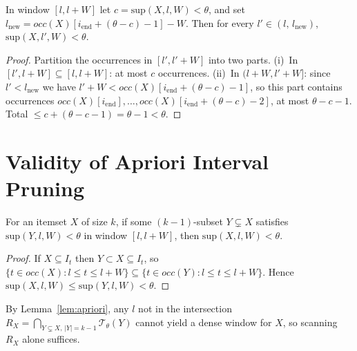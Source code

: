 \begin{lemma}\label{lem:stride_sparse}
In window $[l, l+W]$ let $c = \mathrm{sup}(X, l, W) < \theta$,
and set $l_{\mathrm{new}} = \mathit{occ}(X)[i_{\mathrm{end}} + (\theta-c) - 1] - W$.
Then for every $l' \in (l,\, l_{\mathrm{new}})$,
$\mathrm{sup}(X, l', W) < \theta$.
\end{lemma}

\begin{proof}
Partition the occurrences in $[l', l'+W]$ into two parts.
(i)~In $[l', l+W] \subseteq [l, l+W]$: at most $c$ occurrences.
(ii)~In $(l+W, l'+W]$: since $l' < l_{\mathrm{new}}$ we have
$l'+W < \mathit{occ}(X)[i_{\mathrm{end}}+(\theta-c)-1]$,
so this part contains occurrences
$\mathit{occ}(X)[i_{\mathrm{end}}], \ldots, \mathit{occ}(X)[i_{\mathrm{end}}+(\theta-c)-2]$,
at most $\theta-c-1$.
Total $\leq c + (\theta-c-1) = \theta - 1 < \theta$.
\end{proof}

\section{Validity of Apriori Interval Pruning}

\begin{lemma}\label{lem:apriori}
For an itemset $X$ of size $k$, if some $(k{-}1)$-subset $Y \subsetneq X$
satisfies $\mathrm{sup}(Y, l, W) < \theta$ in window $[l, l+W]$,
then $\mathrm{sup}(X, l, W) < \theta$.
\end{lemma}

\begin{proof}
If $X \subseteq I_t$ then $Y \subset X \subseteq I_t$, so
$\{t \in \mathit{occ}(X) : l \leq t \leq l+W\} \subseteq
 \{t \in \mathit{occ}(Y) : l \leq t \leq l+W\}$.
Hence $\mathrm{sup}(X, l, W) \leq \mathrm{sup}(Y, l, W) < \theta$.
\end{proof}

By Lemma~\ref{lem:apriori}, any $l$ not in the intersection
$R_X = \bigcap_{Y \subsetneq X,\, |Y|=k-1} \mathcal{T}_\theta(Y)$
cannot yield a dense window for $X$, so scanning $R_X$ alone suffices.

